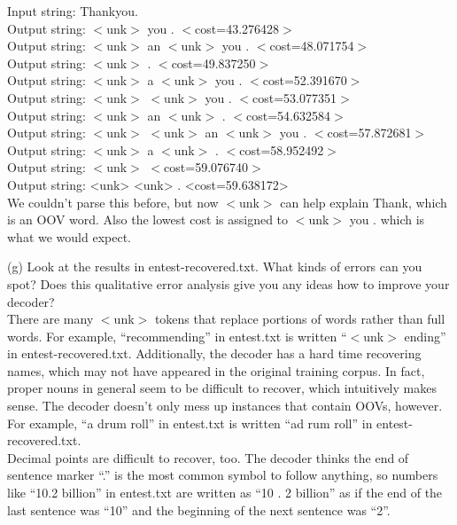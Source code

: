 \documentclass[11pt]{article} %
\begin{document}
Input string: Thankyou.\\
Output string: $<$unk$>$ you . $<$cost=43.276428$>$\\
Output string: $<$unk$>$ an $<$unk$>$ you . $<$cost=48.071754$>$\\
Output string: $<$unk$>$ . $<$cost=49.837250$>$\\
Output string: $<$unk$>$ a $<$unk$>$ you . $<$cost=52.391670$>$\\
Output string: $<$unk$>$ $<$unk$>$ you . $<$cost=53.077351$>$\\
Output string: $<$unk$>$ an $<$unk$>$ . $<$cost=54.632584$>$\\
Output string: $<$unk$>$ $<$unk$>$ an $<$unk$>$ you . $<$cost=57.872681$>$\\
Output string: $<$unk$>$ a $<$unk$>$ . $<$cost=58.952492$>$\\
Output string: $<$unk$>$ $<$cost=59.076740$>$\\
Output string: <unk> <unk> . <cost=59.638172>\\

We couldn’t parse this before, but now $<$unk$>$ can help explain Thank, which is an OOV word. Also the lowest cost is assigned to $<$unk$>$ you . which is what we would expect.\\

\newpage

(g) Look at the results in entest-recovered.txt. What kinds of errors can you spot? Does this qualitative error analysis give you any ideas how to improve your decoder?\\

There are many $<$unk$>$ tokens that replace portions of words rather than full words. For example, ``recommending” in entest.txt is written ``$<$unk$>$ ending” in entest-recovered.txt. Additionally, the decoder has a hard time recovering names, which may not have appeared in the original training corpus. In fact, proper nouns in general seem to be difficult to recover, which intuitively makes sense. The decoder doesn’t only mess up instances that contain OOVs, however. For example, ``a drum roll” in entest.txt is written ``ad rum roll” in entest-recovered.txt.\\

Decimal points are difficult to recover, too. The decoder thinks the end of sentence marker ``.” is the most common symbol to follow anything, so numbers like ``10.2 billion” in entest.txt are written as ``10 . 2 billion” as if the end of the last sentence was ``10” and the beginning of the next sentence was ``2”.\\
\end{document}
